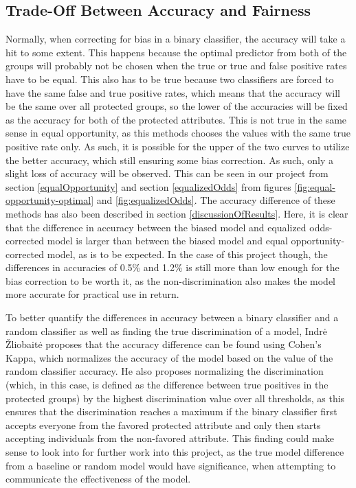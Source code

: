 \documentclass[11pt, fleqn, titlepage]{article}
\begin{document}
	\subsection{Trade-Off Between Accuracy and Fairness}\label{tradeoff}
	Normally, when correcting for bias in a binary classifier, the accuracy will take a hit to some extent. This happens because the optimal predictor from both of the groups will probably not be chosen when the true or true and false positive rates have to be equal. This also has to be true because two classifiers are forced to have the same false and true positive rates, which means that the accuracy will be the same over all protected groups, so the lower of the accuracies will be fixed as the accuracy for both of the protected attributes. This is not true in the same sense in equal opportunity, as this methods chooses the values with the same true positive rate only. As such, it is possible for the upper of the two curves to utilize the better accuracy, which still ensuring some bias correction. As such, only a slight loss of accuracy will be observed. \cite{equal_of_oppor} This can be seen in our project from section \ref{equalOpportunity} and section \ref{equalizedOdds} from figures \ref{fig:equal-opportunity-optimal} and \ref{fig:equalizedOdds}. The accuracy difference of these methods has also been described in section \ref{discussionOfResults}. Here, it is clear that the difference in accuracy between the biased model and equalized odds-corrected model is larger than between the biased model and equal opportunity-corrected model, as is to be expected. In the case of this project though, the differences in accuracies of 0.5\% and 1.2\% is still more than low enough for the bias correction to be worth it, as the non-discrimination also makes the model more accurate for practical use in return.
	
	To better quantify the differences in accuracy between a binary classifier and a random classifier as well as finding the true discrimination of a model, Indrė Žliobaitė proposes that the accuracy difference can be found using Cohen's Kappa, which normalizes the accuracy of the model based on the value of the random classifier accuracy. He also proposes normalizing the discrimination (which, in this case, is defined as the difference between true positives in the protected groups) by the highest discrimination value over all thresholds, as this ensures that the discrimination reaches a maximum if the binary classifier first accepts everyone from the favored protected attribute and only then starts accepting individuals from the non-favored attribute. This finding could make sense to look into for further work into this project, as the true model difference from a baseline or random model would have significance, when attempting to communicate the effectiveness of the model. \cite{bias-accuracy}
	
\end{document}
